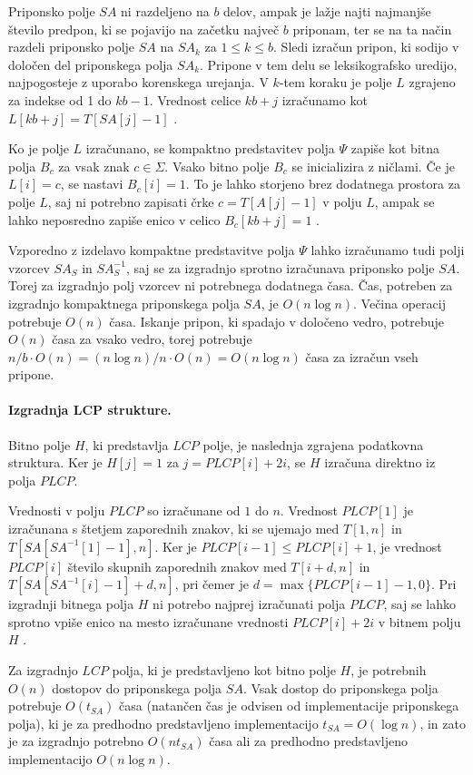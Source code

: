 Priponsko polje $SA$ ni razdeljeno na $b$ delov, ampak je lažje najti najmanjše število predpon, ki se pojavijo na začetku največ $b$ priponam, ter se na ta način razdeli priponsko polje $SA$ na $SA_k$ za $1\le k\le b$. Sledi izračun pripon, ki sodijo v določen del priponskega polja $SA_k$. Pripone v tem delu se leksikografsko uredijo, najpogosteje z uporabo korenskega urejanja. V $k$-tem koraku je polje $L$ zgrajeno za indekse od 1 do $kb-1$. Vrednost celice $kb+j$ izračunamo kot $L[kb+j]=T[SA[j]-1]$ \cite{Navarro2016}.

Ko je polje $L$ izračunano, se kompaktno predstavitev polja $\Psi$ zapiše kot bitna polja $B_c$ za vsak znak $c\in \Sigma$. Vsako bitno polje $B_c$ se inicializira z ničlami. Če je $L[i]=c$, se nastavi $B_c[i]=1$. To je lahko storjeno brez dodatnega prostora za polje $L$, saj ni potrebno zapisati črke $c=T[A[j]-1]$ v polju $L$, ampak se lahko neposredno zapiše enico v celico $B_c[kb+j]=1$ \cite{Navarro2016}.

Vzporedno z izdelavo kompaktne predstavitve polja $\Psi$ lahko izračunamo  tudi polji vzorcev $SA_S$ in $SA_S^{-1}$, saj se za izgradnjo sprotno izračunava priponsko polje $SA$. Torej za izgradnjo polj vzorcev ni potrebnega dodatnega časa. Čas, potreben za izgradnjo kompaktnega priponskega polja $SA$, je $O(n\log{n})$. Večina operacij potrebuje $O(n)$ časa. Iskanje pripon, ki spadajo v določeno vedro, potrebuje $O(n)$ časa za vsako vedro, torej potrebuje $n/b\cdot O(n)=(n\log{n})/n\cdot O(n)=O(n\log{n})$ časa za izračun vseh pripone. 

\paragraph{Izgradnja LCP strukture.}
Bitno polje $H$, ki predstavlja $LCP$ polje, je naslednja zgrajena podatkovna struktura. Ker je $H[j]=1$ za $j=PLCP[i]+2i$, se $H$ izračuna direktno iz polja $PLCP$.

Vrednosti v polju $PLCP$ so izračunane od $1$ do $n$. Vrednost $PLCP[1]$ je izračunana s štetjem zaporednih znakov, ki se ujemajo med $T[1,n]$ in $T[SA[SA^{-1}[1]-1],n]$. Ker je $PLCP[i-1]\le PLCP[i]+1$, je vrednost $PLCP[i]$ število skupnih zaporednih znakov med $T[i+d,n]$ in $T[SA[SA^{-1}[i]-1]+d,n]$, pri čemer je $d=\max\{PLCP[i-1]-1,0\}$.
Pri izgradnji bitnega polja $H$ ni potrebo najprej izračunati polja $PLCP$, saj se lahko sprotno vpiše enico na mesto izračunane vrednosti $PLCP[i]+2i$ v bitnem polju $H$ \cite{Navarro2016}.

Za izgradnjo $LCP$ polja, ki je predstavljeno kot bitno polje $H$, je potrebnih $O(n)$ dostopov do priponskega polja $SA$. Vsak dostop do priponskega polja potrebuje $O(t_{SA})$ časa (natančen čas je odvisen od implementacije priponskega polja), ki je za predhodno predstavljeno implementacijo $t_{SA}= O(\log{n})$, in zato je za izgradnjo potrebno $O(nt_{SA})$ časa ali za predhodno predstavljeno implementacijo $O(n\log{n})$.

